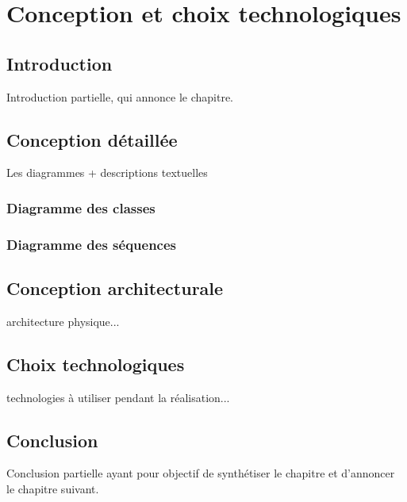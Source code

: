 \chapter{Conception et choix technologiques}

\section*{Introduction}
    Introduction partielle, qui annonce  le chapitre.

\section{Conception détaillée}
    Les diagrammes + descriptions textuelles
    
    \subsection{Diagramme des classes}
        
    \subsection{Diagramme des séquences}

\section{Conception architecturale}
    architecture physique...
    
\section{Choix technologiques}
    technologies à utiliser pendant la réalisation...

\section*{Conclusion}
    Conclusion partielle ayant pour objectif de synthétiser le chapitre et d'annoncer le chapitre suivant.